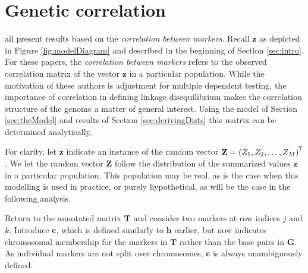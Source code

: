 \documentclass[sts]{imsart}
\newcommand{\ve}[1]{\mathbf{#1}}           %
\newcommand{\m}[1]{\mathbf{#1}}               %
\newcommand{\tr}[1]{{#1}^{\mkern-1.5mu\mathsf{T}}}              %
\begin{document}
\section{Genetic correlation} \label{sec:correlation}

\cite{cheverud2001, LiJi2005, Galwey2009} all present results based on the \emph{correlation between markers}. Recall $\ve{z}$ as depicted in Figure \ref{fig:modelDiagram} and described in the beginning of Section \ref{sec:intro}. For these papers, the \emph{correlation between markers} refers to the observed correlation matrix of the vector $\ve{z}$ in a particular population. While the motivation of these authors is adjustment for multiple dependent testing, the importance of correlation in defining linkage disequilibrium makes the correlation structure of the genome a matter of general interest. Using the model of Section \ref{sec:theModel} and results of Section \ref{sec:derivingDists} this matrix can be determined analytically.

For clarity, let $\ve{z}$ indicate an instance of the random vector $\ve{Z} = \tr{(Z_1, Z_2, \dots, Z_M)}$. We let the random vector $\ve{Z}$ follow the distribution of the summarized values $\ve{z}$ in a particular population. This population may be real, as is the case when this modelling is used in practice, or purely hypothetical, as will be the case in the following analysis.

Return to the annotated matrix $\m{T}$ and consider two markers at row indices $j$ and $k$. Introduce $\ve{c}$, which is defined similarly to $\ve{h}$ earlier, but now indicates chromosomal membership for the markers in $\m{T}$ rather than the base pairs in $\m{G}$. As individual markers are not split over chromosomes, $\ve{c}$ is always unambiguously defined.
\end{document}
